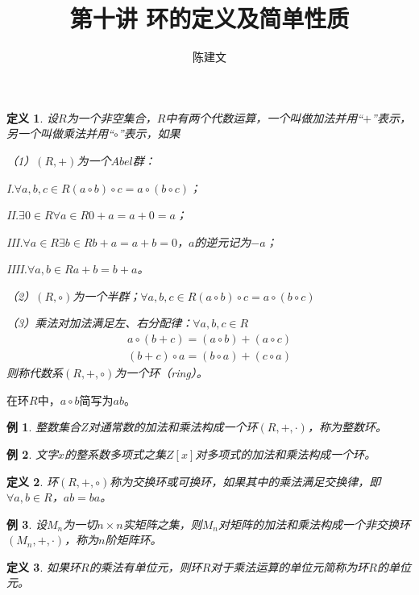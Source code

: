 \documentclass{article}
\newtheorem{Def}{定义}
\newtheorem*{Example}{例}
\begin{document}
\begin{CJK*}{UTF8}{gbsn}
  \title{第十讲 环的定义及简单性质}
  \author{陈建文}
  \maketitle
  \begin{Def}
    设$R$为一个非空集合，$R$中有两个代数运算，一个叫做加法并用“$+$”表示，另一个叫做乘法并用“$\circ$”表示，如果
  
    （1）$(R,+)$为一个$Abel$群：
  
    I.$\forall a,b,c\in R(a\circ b)\circ c=a\circ (b\circ c)$；
  
    II.$\exists 0\in R \forall a\in R 0+a=a+0=a$；
  
    III.$\forall a\in R \exists b\in R b+a = a+b =0$，$a$的逆元记为$-a$；
  
    IIII.$\forall a,b\in R a+b=b+a$。
  
    （2）$(R,\circ)$为一个半群；$\forall a,b,c\in R (a\circ b)\circ c=a\circ (b\circ c)$
  
    （3）乘法对加法满足左、右分配律：$\forall a,b,c\in R$
  \begin{align*}
    a\circ(b+c)=(a\circ b)+(a\circ c)\\
    (b+c)\circ a=(b\circ a) + (c\circ a)
  \end{align*}
  则称代数系$(R,+,\circ)$为一个环（ring）。
  \end{Def}
  在环$R$中，$a\circ b$简写为$ab$。
  \begin{Example}
    整数集合$Z$对通常数的加法和乘法构成一个环$(R,+,\cdot)$，称为整数环。
  \end{Example}
  
  \begin{Example}
    文字$x$的整系数多项式之集$Z[x]$对多项式的加法和乘法构成一个环。
  \end{Example}
  

  \begin{Def}
  环$(R,+,\circ)$称为交换环或可换环，如果其中的乘法满足交换律，即$\forall a,b\in R$，$ab=ba$。
  \end{Def}
  
  \begin{Example}
    设$M_n$为一切$n\times n$实矩阵之集，则$M_n$对矩阵的加法和乘法构成一个非交换环$(M_n,+,\cdot)$，称为$n$阶矩阵环。
  \end{Example}
  
  \begin{Def}
    如果环$R$的乘法有单位元，则环$R$对于乘法运算的单位元简称为环$R$的单位元。
  \end{Def}


\end{CJK*}
\end{document}
